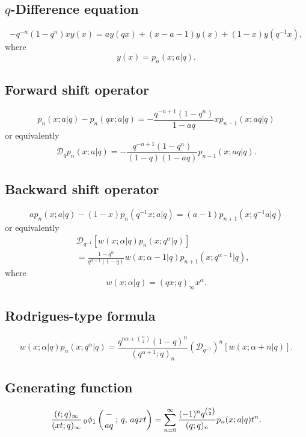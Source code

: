 \documentclass[envcountchap,graybox]{svmono}
\newcommand{\qhyp}[5]{\mbox{}_{#1}{\phi}_{#2}
\left(\genfrac{}{}{0pt}{}{#3}{#4}\,;\,q,\,#5\right)}
\begin{document}
\subsection*{$q$-Difference equation}
\begin{equation}
\label{dvLittleqLaguerre}
-q^{-n}(1-q^n)xy(x)=ay(qx)+(x-a-1)y(x)+(1-x)y(q^{-1}x),
\end{equation}
where
$$y(x)=p_n(x;a|q).$$

\subsection*{Forward shift operator}
\begin{equation}
\label{shift1LittleqLaguerreI}
p_n(x;a|q)-p_n(qx;a|q)=-\frac{q^{-n+1}(1-q^n)}{1-aq}xp_{n-1}(x;aq|q)
\end{equation}
or equivalently
\begin{equation}
\label{shift1LittleqLaguerreII}
\mathcal{D}_qp_n(x;a|q)=-\frac{q^{-n+1}(1-q^n)}{(1-q)(1-aq)}
p_{n-1}(x;aq|q).
\end{equation}

\subsection*{Backward shift operator}
\begin{equation}
\label{shift2LittleqLaguerreI}
ap_n(x;a|q)-(1-x)p_n(q^{-1}x;a|q)=(a-1)p_{n+1}(x;q^{-1}a|q)
\end{equation}
or equivalently
\begin{eqnarray}
\label{shift2LittleqLaguerreII}
& &\mathcal{D}_{q^{-1}}\left[w(x;\alpha|q)p_n(x;q^{\alpha}|q)\right]\nonumber\\
& &{}=\frac{1-q^{\alpha}}{q^{\alpha-1}(1-q)}w(x;\alpha-1|q)p_{n+1}(x;q^{\alpha-1}|q),
\end{eqnarray}
where
$$w(x;\alpha|q)=(qx;q)_{\infty}x^{\alpha}.$$

\subsection*{Rodrigues-type formula}
\begin{equation}
\label{RodLittleqLaguerre}
w(x;\alpha|q)p_n(x;q^{\alpha}|q)=\frac{q^{n\alpha+\binom{n}{2}}(1-q)^n}
{(q^{\alpha+1};q)_n}\left(\mathcal{D}_{q^{-1}}\right)^n\left[w(x;\alpha+n|q)\right].
\end{equation}

\subsection*{Generating function}
\begin{equation}
\label{GenLittleqLaguerre}
\frac{(t;q)_{\infty}}{(xt;q)_{\infty}}\,\qhyp{0}{1}{-}{aq}{aqxt}=\sum_{n=0}^{\infty}
\frac{(-1)^nq^{\binom{n}{2}}}{(q;q)_n}p_n(x;a|q)t^n.
\end{equation}
\end{document}
